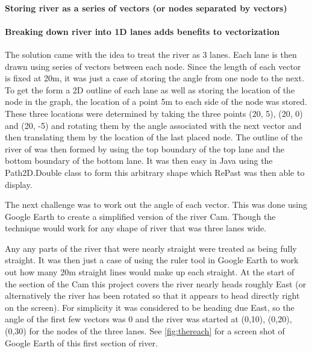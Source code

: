       \paragraph{Storing river as a series of vectors (or nodes separated by vectors)}
      \paragraph{Breaking down river into 1D lanes adds benefits to vectorization}
      The solution came with the idea to treat the river as 3 lanes. Each lane is then drawn using series of vectors between each node. Since the length of each vector is fixed at 20m, it was just a case of storing the angle from one node to the next. To get the form a 2D outline of each lane as well as storing the location of the node in the graph, the location of a point 5m to each side of the node was stored. These three locations were determined by taking the three points (20, 5), (20, 0) and (20, -5) and rotating them by the angle associated with the next vector and then translating them by the location of the last placed node. The outline of the river of was then formed by using the top boundary of the top lane and the bottom boundary of the bottom lane. It was then easy in Java using the Path2D.Double class to form this arbitrary shape which RePast was then able to display.
      
      The next challenge was to work out the angle of each vector. This was done using Google Earth to create a simplified version of the river Cam. Though the technique would work for any shape of river that was three lanes wide.
      
      Any any parts of the river that were nearly straight were treated as being fully straight. It was then just a case of using the ruler tool in Google Earth to work out how many 20m straight lines would make up each straight. At the start of the section of the Cam this project covers the river nearly heads roughly East (or alternatively the river has been rotated so that it appears to head directly right on the screen). For simplicity it was considered to be heading due East, so the angle of the first few vectors was 0 and the river was started at (0,10), (0,20), (0,30) for the nodes of the three lanes. See \ref{fig:thereach} for a screen shot of Google Earth of this first section of river.
      
